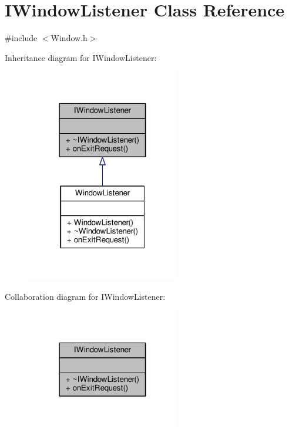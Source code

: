 \hypertarget{class_i_window_listener}{\section{I\-Window\-Listener Class Reference}
\label{class_i_window_listener}
}


{\ttfamily \#include $<$Window.\-h$>$}



Inheritance diagram for I\-Window\-Listener\-:\nopagebreak
\begin{figure}[H]
\begin{center}
\leavevmode
\includegraphics[width=190pt]{class_i_window_listener__inherit__graph}
\end{center}
\end{figure}


Collaboration diagram for I\-Window\-Listener\-:
\nopagebreak
\begin{figure}[H]
\begin{center}
\leavevmode
\includegraphics[width=190pt]{class_i_window_listener__coll__graph}
\end{center}
\end{figure}
